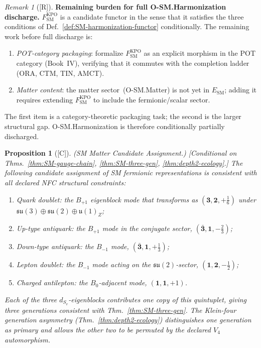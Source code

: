 \documentclass[12pt,oneside]{amsbook}
\theoremstyle{plain}
\newtheorem{proposition}[theorem]{Proposition}
\theoremstyle{definition}
\theoremstyle{remark}
\newtheorem{remark}[theorem]{Remark}
\newcommand{\status}[1]{\textup{[#1]}}
\begin{document}
\begin{remark}[\status{R}]\label{rem:harm-remaining}
\textbf{Remaining burden for full O-SM.Harmonization discharge.}
$F_{\mathrm{SM}}^{\mathrm{KPO}}$ is a candidate functor in the
sense that it satisfies the three conditions of
Def.~\ref{def:SM-harmonization-functor} conditionally. The
remaining work before full discharge is:
\begin{enumerate}[label=\textup{(\arabic*)}]
 \item \emph{POT-category packaging}: formalize
 $F_{\mathrm{SM}}^{\mathrm{KPO}}$ as an explicit morphism
 in the POT category (Book~IV), verifying that it commutes
 with the completion ladder (ORA, CTM, TIN, AMCT).
 \item \emph{Matter content}: the matter sector~(O-SM.Matter)
 is not yet in $E_{\mathrm{SM}}$; adding it requires extending
 $F_{\mathrm{SM}}^{\mathrm{KPO}}$ to include the fermionic/scalar
 sector.
\end{enumerate}
The first item is a category-theoretic packaging task; the second
is the larger structural gap. O-SM.Harmonization is therefore
conditionally partially discharged.
\end{remark}



\begin{proposition}[\status{C}]\label{prop:rh-SM-matter-candidate}
\textup{(SM Matter Candidate Assignment.)}
\textup{[Conditional on Thms.~\ref{thm:SM-gauge-chain},
\ref{thm:SM-three-gen}, \ref{thm:depth2-ecology}.]}
The following candidate assignment of SM fermionic representations
is consistent with all declared NFC structural constraints:
\begin{enumerate}[label=\textup{(\arabic*)}]
 \item \emph{Quark doublet}: the $B_{+1}$ eigenblock mode that
 transforms as $(\mathbf{3}, \mathbf{2}, +\tfrac{1}{6})$ under
 $\mathfrak{su}(3)\oplus\mathfrak{su}(2)\oplus\mathfrak{u}(1)_Z$;
 \item \emph{Up-type antiquark}: the $B_{+1}$ mode in the
 conjugate sector, $(\bar{\mathbf{3}}, \mathbf{1}, -\tfrac{2}{3})$;
 \item \emph{Down-type antiquark}: the $B_{-1}$ mode,
 $(\bar{\mathbf{3}}, \mathbf{1}, +\tfrac{1}{3})$;
 \item \emph{Lepton doublet}: the $B_{-1}$ mode acting on the
 $\mathfrak{su}(2)$-sector, $(\mathbf{1}, \mathbf{2}, -\tfrac{1}{2})$;
 \item \emph{Charged antilepton}: the $B_0$-adjacent mode,
 $(\mathbf{1}, \mathbf{1}, +1)$.
\end{enumerate}
Each of the three $d_{S_v}$-eigenblocks contributes one copy of this
quintuplet, giving three generations consistent with
Thm.~\ref{thm:SM-three-gen}. The Klein-four generation asymmetry
(Thm.~\ref{thm:depth2-ecology}) distinguishes one generation as
primary and allows the other two to be permuted by the declared
$V_4$ automorphism.
\end{proposition}
\end{document}
